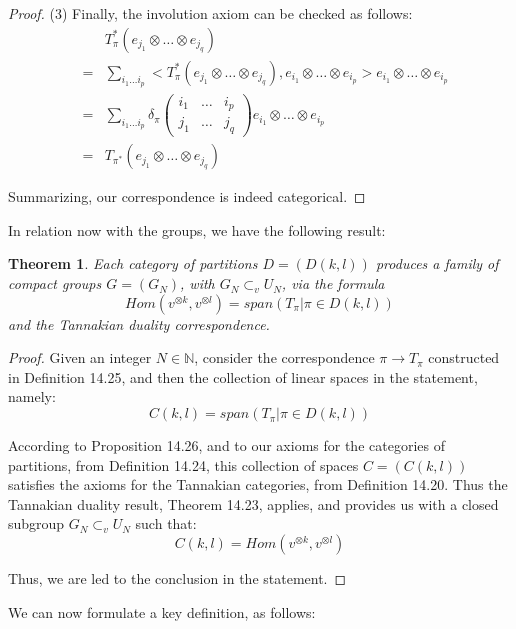\documentclass[12pt]{amsbook}
\newtheorem{theorem}{Theorem}[chapter]
\begin{document}
\begin{proof}
(3) Finally, the involution axiom can be checked as follows:
\begin{eqnarray*}
&&T_\pi^*(e_{j_1}\otimes\ldots\otimes e_{j_q})\\
&=&\sum_{i_1\ldots i_p}<T_\pi^*(e_{j_1}\otimes\ldots\otimes e_{j_q}),e_{i_1}\otimes\ldots\otimes e_{i_p}>e_{i_1}\otimes\ldots\otimes e_{i_p}\\
&=&\sum_{i_1\ldots i_p}\delta_\pi\begin{pmatrix}i_1&\ldots&i_p\\ j_1&\ldots& j_q\end{pmatrix}e_{i_1}\otimes\ldots\otimes e_{i_p}\\
&=&T_{\pi^*}(e_{j_1}\otimes\ldots\otimes e_{j_q})
\end{eqnarray*}

Summarizing, our correspondence is indeed categorical.
\end{proof}

In relation now with the groups, we have the following result:


\begin{theorem}
Each category of partitions $D=(D(k,l))$ produces a family of compact groups $G=(G_N)$, with $G_N\subset_vU_N$, via the formula
$$Hom(v^{\otimes k},v^{\otimes l})=span\left(T_\pi\Big|\pi\in D(k,l)\right)$$
and the Tannakian duality correspondence.
\end{theorem}

\begin{proof}
Given an integer $N\in\mathbb N$, consider the correspondence $\pi\to T_\pi$ constructed in Definition 14.25, and then the collection of linear spaces in the statement, namely:
$$C(k,l)=span\left(T_\pi\Big|\pi\in D(k,l)\right)$$

According to Proposition 14.26, and to our axioms for the categories of partitions, from Definition 14.24, this collection of spaces $C=(C(k,l))$ satisfies the axioms for the Tannakian categories, from Definition 14.20. Thus the Tannakian duality result, Theorem 14.23, applies, and provides us with a closed subgroup $G_N\subset_vU_N$ such that:
$$C(k,l)=Hom(v^{\otimes k},v^{\otimes l})$$

Thus, we are led to the conclusion in the statement.
\end{proof}

We can now formulate a key definition, as follows:

\end{document}
